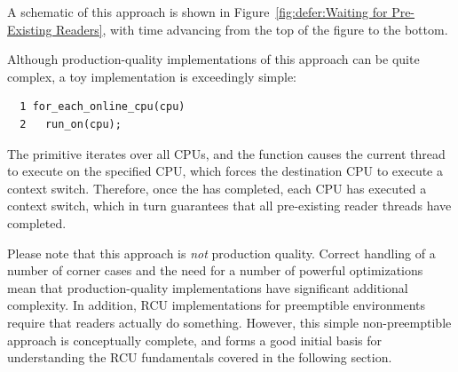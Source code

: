 A schematic of this approach is shown in
Figure~\ref{fig:defer:Waiting for Pre-Existing Readers},
with time advancing from the top of the figure to the bottom.

Although production-quality implementations of this approach can be
quite complex, a toy implementation is exceedingly simple:

\vspace{5pt}
\begin{minipage}[t]{\columnwidth}
\scriptsize
\begin{verbatim}
  1 for_each_online_cpu(cpu)
  2   run_on(cpu);
\end{verbatim}
\end{minipage}
\vspace{5pt}

The  primitive iterates over all CPUs, and
the  function causes the current thread to execute on the
specified CPU, which forces the destination CPU to execute a context
switch.
Therefore, once the  has completed, each CPU
has executed a context switch, which in turn guarantees that
all pre-existing reader threads have completed.

Please note that this approach is \emph{not} production quality.
Correct handling of a number of corner cases and the need for a number
of powerful optimizations mean that production-quality implementations
have significant additional complexity.
In addition, RCU implementations for preemptible environments
require that readers actually do something.
However, this simple non-preemptible approach is conceptually complete,
and forms a good initial basis for understanding the RCU fundamentals
covered in the following section.
